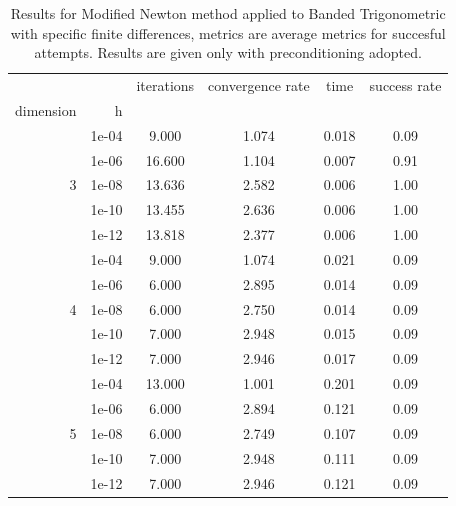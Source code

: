 \begin{table}
\centering
\caption{Results for Modified Newton method applied to Banded Trigonometric with specific finite differences, metrics are average metrics for succesful attempts. Results are given only with preconditioning adopted.}
\label{tab:Modified_Newton_Banded_Trigonometric_fd_rel}
\begin{tabular}{rr|cccc}
\toprule
    &  & iterations & convergence rate & time & success rate \\
dimension & h &  &  &  &  \\
\midrule
\multirow[t]{5}{*}{3} & 1e-04 & 9.000 & 1.074 & 0.018 & 0.09 \\
    & 1e-06 & 16.600 & 1.104 & 0.007 & 0.91 \\
    & 1e-08 & 13.636 & 2.582 & 0.006 & 1.00 \\
    & 1e-10 & 13.455 & 2.636 & 0.006 & 1.00 \\
    & 1e-12 & 13.818 & 2.377 & 0.006 & 1.00 \\
\cline{1-6}
\multirow[t]{5}{*}{4} & 1e-04 & 9.000 & 1.074 & 0.021 & 0.09 \\
    & 1e-06 & 6.000 & 2.895 & 0.014 & 0.09 \\
    & 1e-08 & 6.000 & 2.750 & 0.014 & 0.09 \\
    & 1e-10 & 7.000 & 2.948 & 0.015 & 0.09 \\
    & 1e-12 & 7.000 & 2.946 & 0.017 & 0.09 \\
\cline{1-6}
\multirow[t]{5}{*}{5} & 1e-04 & 13.000 & 1.001 & 0.201 & 0.09 \\
    & 1e-06 & 6.000 & 2.894 & 0.121 & 0.09 \\
    & 1e-08 & 6.000 & 2.749 & 0.107 & 0.09 \\
    & 1e-10 & 7.000 & 2.948 & 0.111 & 0.09 \\
    & 1e-12 & 7.000 & 2.946 & 0.121 & 0.09 \\
\cline{1-6}
\bottomrule
\end{tabular}
\end{table}

